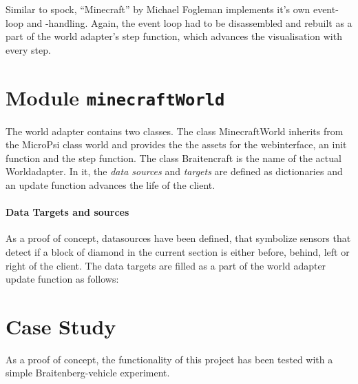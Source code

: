 Similar to spock, ``Minecraft'' by Michael Fogleman implements it's own event-loop and -handling. Again, the event loop had to be disassembled and rebuilt as a part of the world adapter's step function, which advances the visualisation with every step.

    \section{Module \texttt{minecraftWorld}}
The world adapter contains two classes. The class MinecraftWorld inherits from the MicroPsi class world and provides the the assets for the webinterface, an init function and the step function. The class Braitencraft is the name of the actual Worldadapter. In it, the \emph{data sources} and \emph{targets} are defined as dictionaries and an update function advances the life of the client.
    
\paragraph{Data Targets and sources}

As a proof of concept, datasources have been defined, that symbolize sensors that detect if a block of diamond in the current section is either before, behind, left or right of the client. The data targets are filled as a part of the world adapter update function as follows:



    \section{Case Study}
As a proof of concept, the functionality of this project has been tested with a simple Braitenberg-vehicle experiment.